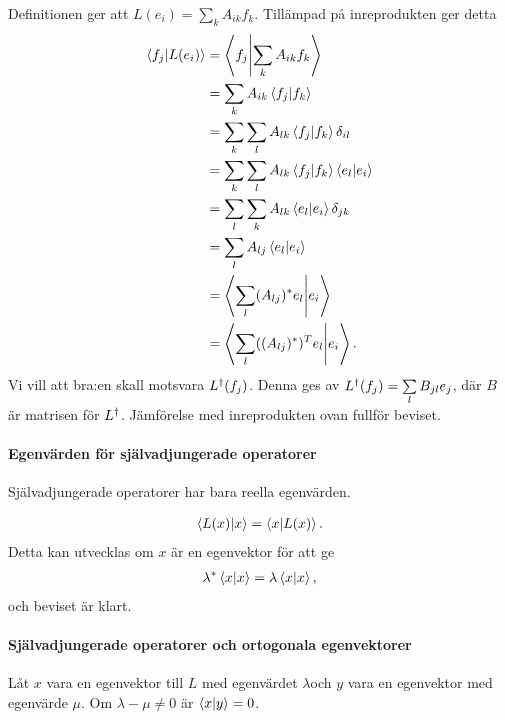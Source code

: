 Definitionen ger att $L(e_{i}) = \sum\limits_{k}A_{ik}f_{k}$. Tillämpad på inreprodukten ger detta
\begin{align*}
	\bra{f_{j}}\ket{L(e_{i})} &= \bra{f_{j}}\ket{\sum\limits_{k}A_{ik}f_{k}} \\
	                         &= \sum\limits_{k}A_{ik}\bra{f_{j}}\ket{f_{k}} \\
	                         &= \sum\limits_{k}\sum\limits_{l}A_{lk}\bra{f_{j}}\ket{f_{k}}\delta_{il} \\
	                         &= \sum\limits_{k}\sum\limits_{l}A_{lk}\bra{f_{j}}\ket{f_{k}}\bra{e_{l}}\ket{e_{i}} \\
	                         &= \sum\limits_{l}\sum\limits_{k}A_{lk}\bra{e_{l}}\ket{e_{i}}\delta_{jk} \\
	                         &= \sum\limits_{l}A_{lj}\bra{e_{l}}\ket{e_{i}} \\
	                         &= \bra{\sum\limits_{l}(A_{lj})^{*}e_{l}}\ket{e_{i}} \\
	                         &= \bra{\sum\limits_{l}((A_{lj})^{*})^{T}e_{l}}\ket{e_{i}}.
\end{align*}
Vi vill att bra:en skall motsvara $L^{\dagger}(f_{j})$. Denna ges av $L^{\dagger}(f_{j}) = \sum\limits_{l}B_{jl}e_{j}$, där $B$ är matrisen för $L^{\dagger}$. Jämförelse med inreprodukten ovan fullför beviset.

\paragraph{Egenvärden för självadjungerade operatorer}
Självadjungerade operatorer har bara reella egenvärden.

\proof
\begin{align*}
	\bra{L(x)}\ket{x} = \bra{x}\ket{L(x)}.
\end{align*}
Detta kan utvecklas om $x$ är en egenvektor för att ge
\begin{align*}
	\lambda^{*}\bra{x}\ket{x} = \lambda\bra{x}\ket{x},
\end{align*}
och beviset är klart.

\paragraph{Självadjungerade operatorer och ortogonala egenvektorer}
Låt $x$ vara en egenvektor till $L$ med egenvärdet $\lambda $och $y$ vara en egenvektor med egenvärde $\mu$. Om $\lambda - \mu \neq 0$ är $\bra{x}\ket{y} = 0$.

